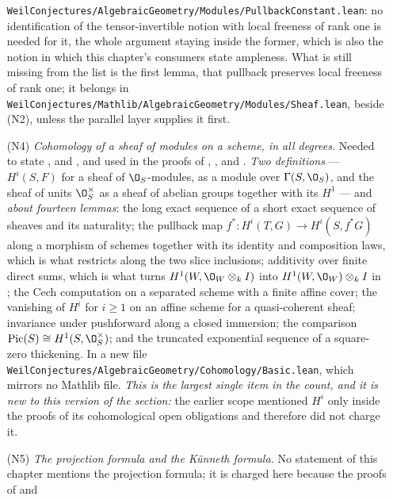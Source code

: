 \begin{enumerate}
  \texttt{WeilConjectures/AlgebraicGeometry/Modules/PullbackConstant.lean}: no
  identification of the tensor-invertible notion with local freeness of rank
  one is needed for it, the whole argument staying inside the former, which is
  also the notion in which this chapter's consumers state ampleness.  What is
  still missing from the list is the first lemma, that pullback preserves
  local freeness of rank one; it belongs in
  \texttt{WeilConjectures/Mathlib/AlgebraicGeometry/Modules/Sheaf.lean},
  beside (N2), unless the parallel layer supplies it first.
  \item[(N4)] \emph{Cohomology of a sheaf of modules on a scheme, in all
  degrees.}  Needed to state ,
   and , and used
  in the proofs of ,
  ,  and
  .  \emph{Two definitions} --- $H^i(S,F)$
  for a sheaf of $\O_S$-modules, as a module over $\Gamma(S,\O_S)$, and the
  sheaf of units $\O_S^\times$ as a sheaf of abelian groups together with its
  $H^1$ --- and \emph{about fourteen lemmas}: the long exact sequence of a
  short exact sequence of sheaves and its naturality; the pullback map
  $f^*\colon H^i(T,G)\to H^i(S,f^*G)$ along a morphism of schemes together
  with its identity and composition laws, which is what
   restricts along the two slice inclusions;
  additivity over finite direct
  sums, which is what turns
  $H^1(W,\O_W\otimes_kI)$ into $H^1(W,\O_W)\otimes_kI$ in
  ; the Cech computation on a separated
  scheme with a finite affine cover; the vanishing of $H^i$ for $i\geq1$ on an
  affine scheme for a quasi-coherent sheaf; invariance under pushforward along
  a closed immersion; the comparison
  $\mathrm{Pic}(S)\cong H^1(S,\O_S^\times)$; and the truncated exponential
  sequence of a square-zero thickening.  In a new file
  \texttt{WeilConjectures/AlgebraicGeometry/Cohomology/Basic.lean}, which
  mirrors no Mathlib file.  \emph{This is the largest single item in the
  count, and it is new to this version of the section:} the earlier scope
  mentioned $H^i$ only inside the proofs of its cohomological open obligations
  and therefore did not charge it.
  \item[(N5)] \emph{The projection formula and the K\"unneth formula.}  No
  statement of this chapter mentions the projection formula; it is charged
  here because the proofs of  and

\end{enumerate}
